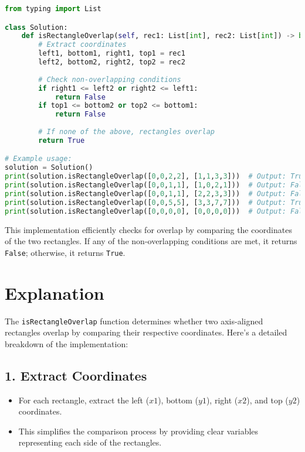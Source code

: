 \begin{fullwidth}
\begin{lstlisting}[language=Python]
from typing import List

class Solution:
    def isRectangleOverlap(self, rec1: List[int], rec2: List[int]) -> bool:
        # Extract coordinates
        left1, bottom1, right1, top1 = rec1
        left2, bottom2, right2, top2 = rec2
        
        # Check non-overlapping conditions
        if right1 <= left2 or right2 <= left1:
            return False
        if top1 <= bottom2 or top2 <= bottom1:
            return False
        
        # If none of the above, rectangles overlap
        return True

# Example usage:
solution = Solution()
print(solution.isRectangleOverlap([0,0,2,2], [1,1,3,3]))  # Output: True
print(solution.isRectangleOverlap([0,0,1,1], [1,0,2,1]))  # Output: False
print(solution.isRectangleOverlap([0,0,1,1], [2,2,3,3]))  # Output: False
print(solution.isRectangleOverlap([0,0,5,5], [3,3,7,7]))  # Output: True
print(solution.isRectangleOverlap([0,0,0,0], [0,0,0,0]))  # Output: False
\end{lstlisting}
\end{fullwidth}

This implementation efficiently checks for overlap by comparing the coordinates of the two rectangles. If any of the non-overlapping conditions are met, it returns \texttt{False}; otherwise, it returns \texttt{True}.

\section*{Explanation}

The \texttt{isRectangleOverlap} function determines whether two axis-aligned rectangles overlap by comparing their respective coordinates. Here's a detailed breakdown of the implementation:

\subsection*{1. Extract Coordinates}

\begin{itemize}
    \item For each rectangle, extract the left (\(x1\)), bottom (\(y1\)), right (\(x2\)), and top (\(y2\)) coordinates.
    \item This simplifies the comparison process by providing clear variables representing each side of the rectangles.
\end{itemize}

